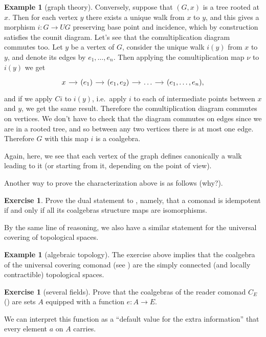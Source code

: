 \documentclass[12pt,oneside]{scrbook}
\numberwithin{equation}{section}
\theoremstyle{plain}
\theoremstyle{definition}
\newtheorem{eg}[thm]{Example}
\newtheorem{ex}[thm]{Exercise}
\newcommand{\ar}[2][]{\arrow{#2}{#1}}
\DeclareMathOperator{\1}{\mathbbm{1}}
\DeclareMathOperator{\2}{\mathbbm{2}}
\begin{document}
\begin{eg}[graph theory]
 Conversely, suppose that $(G,x)$ is a tree rooted at $x$. Then for each vertex $y$ there exists a unique walk from $x$ to $y$, and this gives a morphism $i:G\to UG$ preserving base point and incidence, which by construction satisfies the counit diagram. Let's see that the comultiplication diagram commutes too. Let $y$ be a vertex of $G$, consider the unique walk $i(y)$ from $x$ to $y$, and denote its edges by $e_1,\dots,e_n$. Then applying the comultiplication map $\nu$ to $i(y)$ we get 
 $$
 \begin{tikzcd}[sep=small]
  x \ar{r} & (e_1) \ar{r} & (e_1,e_2) \ar{r} &\dots \ar{r} & (e_1,\dots,e_n) ,
 \end{tikzcd}
 $$
 and if we apply $Ci$ to $i(y)$, i.e.~apply $i$ to each of intermediate points between $x$ and $y$, we get the same result. Therefore the comultiplication diagram commutes on vertices.  
 We don't have to check that the diagram commutes on edges since we are in a rooted tree, and so between any two vertices there is at most one edge. Therefore $G$ with this map $i$ is a coalgebra.
\end{eg}

Again, here, we see that each vertex of the graph defines canonically a walk leading to it (or starting from it, depending on the point of view).


Another way to prove the characterization above is as follows (why?).

\begin{ex}
 Prove the dual statement to , namely, that a comonad is idempotent if and only if all its coalgebras structure maps are isomorphisms. 
\end{ex}

By the same line of reasoning, we also have a similar statement for the universal covering of topological spaces.

\begin{eg}[algebraic topology]
 The exercise above implies that the coalgebra of the universal covering comonad (see ) are the simply connected (and locally contractible) topological spaces. 
\end{eg}


\begin{ex}[several fields]
 Prove that the coalgebras of the reader comonad $C_E$ () are sets $A$ equipped with a function $e:A\to E$. 
 
 We can interpret this function as a ``default value for the extra information'' that every element $a$ on $A$ carries.
\end{ex}
\end{document}
